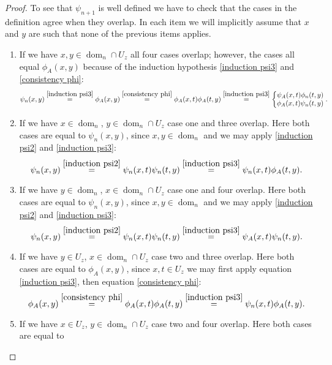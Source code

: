 \documentclass[b5paper,draft,openbib,12pt]{memoir}
\DeclareMathOperator{\dom}{dom}
\begin{document}
\begin{proof}
  To see that \(\psi_{n+1}\) is well defined we have to check that the cases in the definition agree when they overlap. 
  In each item we will implicitly assume that \(x\) and \(y\) are such that none of the previous items applies.
  \begin{enumerate}
  \item If we have \(x,y \in \dom_n\cap U_z\) all four cases overlap; however, the cases all equal \(\phi_A(x,y)\) because of the
  induction hypothesis  \eqref{induction psi3} and \eqref{consistency phi}:
  \begin{equation}
  \psi_n(x,y)\overset{\eqref{induction psi3}}{=}\phi_A(x,y)\overset{\eqref{consistency phi}}{=}\phi_A(x,t) \phi_A(t,y)
  \overset{\eqref{induction psi3}}{=}\left\{\begin{matrix}\psi_A(x,t) \phi_n(t,y)\\ \phi_A(x,t) \psi_n(t,y)\end{matrix}\right..
  \end{equation}
  \item If we have \(x\in \dom_n\), \(y\in \dom_n\cap U_z\) case one and three overlap. Here both cases are equal to
  \(\psi_n(x,y)\), since \(x,y\in \dom_n\) and we may apply \eqref{induction psi2} and \eqref{induction psi3}:
  \begin{equation}
  \psi_n(x,y)\overset{\eqref{induction psi2}}{=}\psi_n(x,t)\psi_n(t,y)\overset{\eqref{induction psi3}}{=}\psi_n(x,t)\phi_A(t,y).
  \end{equation}
  \item If we have \(y\in \dom_n\), \(x\in \dom_n\cap U_z\) case one and four overlap. Here both cases are equal to
  \(\psi_n(x,y)\), since \(x,y\in \dom_n\) and we may apply \eqref{induction psi2} and \eqref{induction psi3}:
  \begin{equation}
  \psi_n(x,y)\overset{\eqref{induction psi2}}{=}\psi_n(x,t)\psi_n(t,y)\overset{\eqref{induction psi3}}{=}\psi_A(x,t)\psi_n(t,y).
  \end{equation}
  \item If we have \(y\in U_z\), \(x\in \dom_n\cap U_z\) case two and three overlap. Here both cases are equal to
  \(\phi_A(x,y)\), since \(x,t\in U_z\) we may first apply equation \eqref{induction psi3}, then equation \eqref{consistency phi}:
  \begin{equation}
  \phi_A(x,y)\overset{\eqref{consistency phi}}{=}\phi_A(x,t)\phi_A(t,y)\overset{\eqref{induction psi3}}{=}\psi_n(x,t)\phi_A(t,y).
  \end{equation}
  \item If we have \(x\in U_z\), \(y\in \dom_n\cap U_z\) case two and four overlap. Here both cases are equal to

\end{enumerate}
\end{proof}
\end{document}
